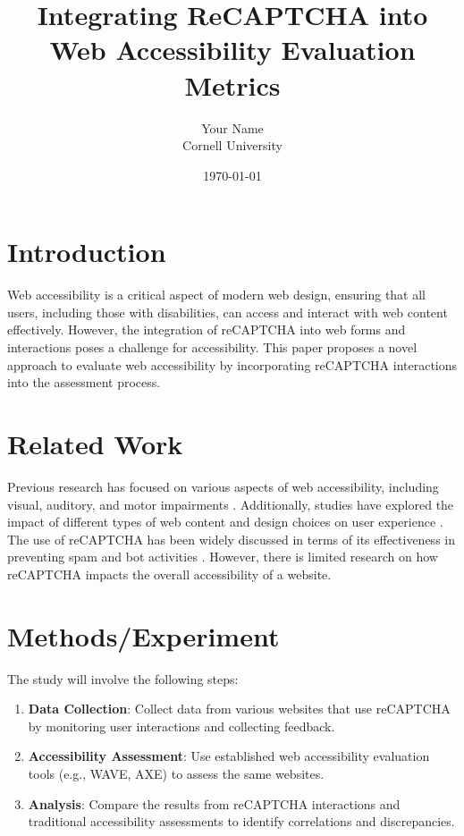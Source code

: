 \documentclass{article}
\title{Integrating ReCAPTCHA into Web Accessibility Evaluation Metrics}
\author{Your Name \\ Cornell University}
\date{\today}
\begin{document}
\maketitle

\section{Introduction}
Web accessibility is a critical aspect of modern web design, ensuring that all users, including those with disabilities, can access and interact with web content effectively. However, the integration of reCAPTCHA into web forms and interactions poses a challenge for accessibility. This paper proposes a novel approach to evaluate web accessibility by incorporating reCAPTCHA interactions into the assessment process. 

\section{Related Work}
Previous research has focused on various aspects of web accessibility, including visual, auditory, and motor impairments \cite{webaccessibility}. Additionally, studies have explored the impact of different types of web content and design choices on user experience \cite{webdesign}. The use of reCAPTCHA has been widely discussed in terms of its effectiveness in preventing spam and bot activities \cite{recaptcha}. However, there is limited research on how reCAPTCHA impacts the overall accessibility of a website.

\section{Methods/Experiment}
The study will involve the following steps:
\begin{enumerate}
    \item \textbf{Data Collection}: Collect data from various websites that use reCAPTCHA by monitoring user interactions and collecting feedback.
    \item \textbf{Accessibility Assessment}: Use established web accessibility evaluation tools (e.g., WAVE, AXE) to assess the same websites.
    \item \textbf{Analysis}: Compare the results from reCAPTCHA interactions and traditional accessibility assessments to identify correlations and discrepancies.
\end{enumerate}
\end{document}
